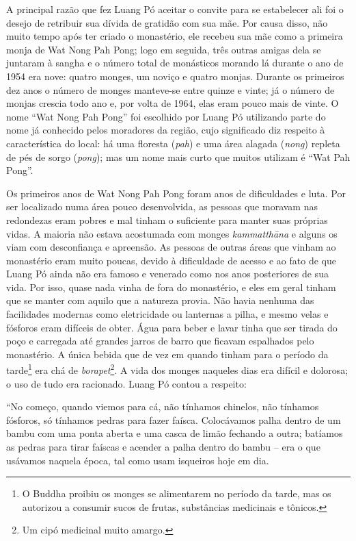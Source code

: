 A principal razão que fez Luang Pó aceitar o convite para se estabelecer
ali foi o desejo de retribuir sua dívida de gratidão com sua mãe. Por
causa disso, não muito tempo após ter criado o monastério, ele recebeu
sua mãe como a primeira monja de Wat Nong Pah Pong; logo em seguida,
três outras amigas dela se juntaram à sangha e o número total de
monásticos morando lá durante o ano de 1954 era nove: quatro monges, um
noviço e quatro monjas. Durante os primeiros dez anos o número de monges
manteve-se entre quinze e vinte; já o número de monjas crescia todo ano
e, por volta de 1964, elas eram pouco mais de vinte. O nome ``Wat Nong
Pah Pong'' foi escolhido por Luang Pó utilizando parte do nome já
conhecido pelos moradores da região, cujo significado diz respeito à
característica do local: há uma floresta (\emph{pah}) e uma área alagada
(\emph{nong}) repleta de pés de sorgo (\emph{pong}); mas um nome mais
curto que muitos utilizam é ``Wat Pah Pong''.

Os primeiros anos de Wat Nong Pah Pong foram anos de dificuldades e
luta. Por ser localizado numa área pouco desenvolvida, as pessoas que
moravam nas redondezas eram pobres e mal tinham o suficiente para manter
suas próprias vidas. A maioria não estava acostumada com monges
\emph{kammatthāna} e alguns os viam com desconfiança e apreensão. As
pessoas de outras áreas que vinham ao monastério eram muito poucas,
devido à dificuldade de acesso e ao fato de que Luang Pó ainda não era
famoso e venerado como nos anos posteriores de sua vida. Por isso, quase
nada vinha de fora do monastério, e eles em geral tinham que se manter
com aquilo que a natureza provia. Não havia nenhuma das facilidades
modernas como eletricidade ou lanternas a pilha, e mesmo velas e
fósforos eram difíceis de obter. Água para beber e lavar tinha que ser
tirada do poço e carregada até grandes jarros de barro que ficavam
espalhados pelo monastério. A única bebida que de vez em quando tinham
para o período da tarde\footnote{O Buddha proibiu os monges se
  alimentarem no período da tarde, mas os autorizou a consumir sucos de
  frutas, substâncias medicinais e tônicos.} era chá de
\emph{borapet}\footnote{Um cipó medicinal muito amargo.}. A vida dos
monges naqueles dias era difícil e dolorosa; o uso de tudo era
racionado. Luang Pó contou a respeito:

``No começo, quando viemos para cá, não tínhamos chinelos, não tínhamos
fósforos, só tínhamos pedras para fazer faísca. Colocávamos palha dentro
de um bambu com uma ponta aberta e uma casca de limão fechando a outra;
batíamos as pedras para tirar faíscas e acender a palha dentro do bambu
-- era o que usávamos naquela época, tal como usam isqueiros hoje em
dia.

